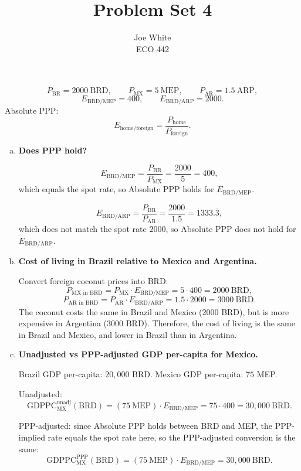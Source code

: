 \documentclass[11pt]{article}
\newenvironment{problem}[2][Problem]{\begin{trivlist}
\item[\hskip \labelsep {\bfseries #1}\hskip \labelsep {\bfseries #2.}]
\leavevmode\par
}{\end{trivlist}}
\begin{document}
\title{Problem Set 4}
\author{Joe White\\ ECO 442}
\maketitle

\begin{problem}{1}
\[
P_{\text{BR}} = 2000~\text{BRD},\qquad
P_{\text{MX}} = 5~\text{MEP},\qquad
P_{\text{AR}} = 1.5~\text{ARP},
\]
\[
E_{\text{BRD/MEP}} = 400,\qquad E_{\text{BRD/ARP}} = 2000.
\]
Absolute PPP:
\[
E_{\text{home/foreign}}=\frac{P_{\text{home}}}{P_{\text{foreign}}}.
\]

\begin{enumerate}[(a)]
  \item \textbf{Does PPP hold?}

  \[
  E_{\text{BRD/MEP}}
  =\frac{P_{\text{BR}}}{P_{\text{MX}}}
  =\frac{2000}{5}
  =400,
  \]
  which equals the spot rate, so Absolute PPP holds for $E_{\text{BRD/MEP}}$.

  \[
  E_{\text{BRD/ARP}}
  =\frac{P_{\text{BR}}}{P_{\text{AR}}}
  =\frac{2000}{1.5}
  =1333.\overline{3},
  \]
  which does not match the spot rate $2000$, so Absolute PPP does not hold for $E_{\text{BRD/ARP}}$.

  \item \textbf{Cost of living in Brazil relative to Mexico and Argentina.}

  Convert foreign coconut prices into BRD:
  \[
  P_{\text{MX in BRD}}
  = P_{\text{MX}}\cdot E_{\text{BRD/MEP}}
  = 5\cdot 400
  =2000~\text{BRD},
  \]
  \[
  P_{\text{AR in BRD}}
  = P_{\text{AR}}\cdot E_{\text{BRD/ARP}}
  = 1.5\cdot 2000
  =3000~\text{BRD}.
  \]
  The coconut costs the same in Brazil and Mexico (2000 BRD), but is more expensive in Argentina (3000 BRD). Therefore, the cost of living is the same in Brazil and Mexico, and lower in Brazil than in Argentina.

  \item \textbf{Unadjusted vs PPP-adjusted GDP per-capita for Mexico.}

  Brazil GDP per-capita: $20{,}000$ BRD. Mexico GDP per-capita: $75$ MEP.

  Unadjusted:
  \[
  \text{GDPPC}_{\text{MX}}^{\text{unadj}}(\text{BRD})
  = (75~\text{MEP})\cdot E_{\text{BRD/MEP}}
  = 75\cdot 400
  = 30{,}000~\text{BRD}.
  \]

  PPP-adjusted: since Absolute PPP holds between BRD and MEP, the PPP-implied rate equals the spot rate here, so the PPP-adjusted conversion is the same:
  \[
  \text{GDPPC}_{\text{MX}}^{\text{PPP}}(\text{BRD})
  = (75~\text{MEP})\cdot E_{\text{BRD/MEP}}
  = 30{,}000~\text{BRD}.
  \]


\end{enumerate}
\end{problem}
\end{document}
